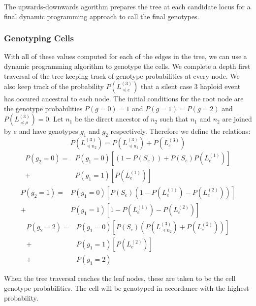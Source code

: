\documentclass[../../main.tex]{subfiles}
\begin{document}
The upwards-downwards agorithm prepares the tree at each candidate locus for a final dynamic programming approach to call the final genotypes.

\subsubsection*{Genotyping Cells}
With all of these values computed for each of the edges in the tree, we can use a dynamic programming algorithm to genotype the cells. We complete a depth first traversal of the tree keeping track of genotype probabilities at every node. We also keep track of the probability $P(L_{\preceq e}^{(3)})$ that a silent case 3 haploid event has occured ancestral to each node. The initial conditions for the root node are the genotype probabilities $P(g=0)=1$ and $P(g=1)=P(g=2)$ and $P(L_{\preceq \rho}^{(3)}) = 0$. Let $n_1$ be the direct ancestor of $n_2$ such that $n_1$ and $n_2$ are joined by $e$ and have genotypes $g_1$ and $g_2$ respectively. Therefore we define the relations:
\begin{equation*}
P(L^{(3)}_{\preceq n_2}) = P(L^{(3)}_{\preceq n_1}) +P(L^{(3)}_e)
\end{equation*}
\begin{align*}
P(g_2 = 0) = &P(g_1=0)\left[(1-P(S_e))+P(S_e)P(L^{(1)}_e)\right]\\
+ &P(g_1 = 1)\left[P(L^{(1)}_e)\right]
\end{align*}
\begin{align*}
P(g_2 = 1) = &P(g_1=0)\left[P(S_e)(1-P(L^{(1)}_e)-P(L^{(2)}_e))\right]\\
+ &P(g_1 = 1)\left[1-P(L^{(1)}_e)-P(L^{(2)}_e)\right]
\end{align*}
\begin{align*}
P(g_2=2) = &P(g_1=0)\left[P(S_e)(P(L^{(3)}_{\preceq n_2}) + P(L^{(2)}_e))\right]\\
+ &P(g_1=1)\left[P(L^{(2)}_e)\right]\\
+ &P(g_1=2)
\end{align*}

When the tree traversal reaches the leaf nodes, these are taken to be the cell genotype probabilities. The cell will be genotyped in accordance with the highest probability.
\end{document}
